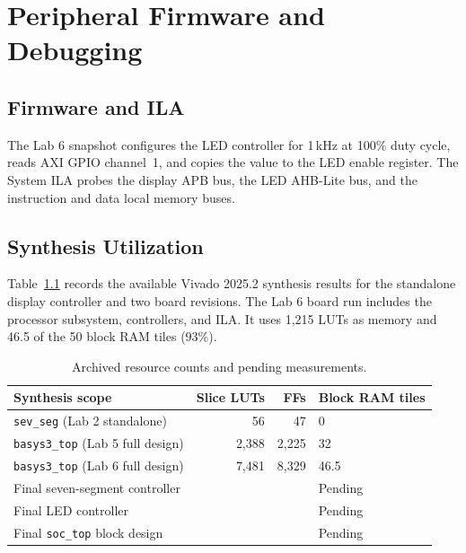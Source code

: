 \chapter{Peripheral Firmware and Debugging}

\section{Firmware and ILA}

The Lab 6 snapshot configures the LED controller for 1\,kHz at 100\% duty
cycle, reads AXI GPIO channel~1, and copies the value to the LED enable
register. The System ILA probes the display APB bus, the LED AHB-Lite bus,
and the instruction and data local memory buses.

\section{Synthesis Utilization}

Table~\ref{tab:resources} records the available Vivado 2025.2 synthesis
results for the standalone display controller and two board revisions.
The Lab 6 board run includes the processor subsystem, controllers, and ILA.
It uses 1,215 LUTs as memory and 46.5 of the 50 block RAM tiles (93\%).

\begin{table}[htbp]
  \centering
  \begin{tabular}{@{}lrrl@{}}
    \toprule
    Synthesis scope & Slice LUTs & FFs & Block RAM tiles \\
    \midrule
    \texttt{sev\_seg} (Lab 2 standalone) & 56 & 47 & 0 \\
    \texttt{basys3\_top} (Lab 5 full design) & 2,388 & 2,225 & 32 \\
    \texttt{basys3\_top} (Lab 6 full design) & 7,481 & 8,329 & 46.5 \\
    Final seven-segment controller & & & Pending \\
    Final LED controller & & & Pending \\
    Final \texttt{soc\_top} block design & & & Pending \\
    \bottomrule
  \end{tabular}
  \caption{Archived resource counts and pending measurements.}
  \label{tab:resources}
\end{table}

